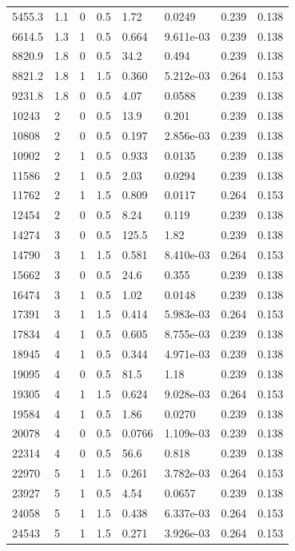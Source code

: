 \documentclass[preview]{standalone}
\begin{document}
{{\begin{tabular}{L{1.2cm}C{1.2cm} C{0.3cm}C{0.5cm} C{1.4cm}C{1.4cm} C{1.4cm}C{1.4cm}}
  5455.3  &   1.1  & 0     & 0.5 &  1.72  & 0.0249  & 0.239 &  0.138   \\ 
  6614.5  &   1.3  & 1     & 0.5 &  0.664  & 9.611e-03  & 0.239 &  0.138   \\ 
  8820.9  &   1.8  & 0     & 0.5 &  34.2  & 0.494  & 0.239 &  0.138   \\ 
  8821.2  &   1.8  & 1     & 1.5 &  0.360  & 5.212e-03  & 0.264 &  0.153   \\ 
  9231.8  &   1.8  & 0     & 0.5 &  4.07  & 0.0588  & 0.239 &  0.138   \\ 
  10243  &     2  & 0     & 0.5 &  13.9  & 0.201  & 0.239 &  0.138   \\ 
  10808  &     2  & 0     & 0.5 &  0.197  & 2.856e-03  & 0.239 &  0.138   \\ 
  10902  &     2  & 1     & 0.5 &  0.933  & 0.0135  & 0.239 &  0.138   \\ 
  11586  &     2  & 1     & 0.5 &  2.03  & 0.0294  & 0.239 &  0.138   \\ 
  11762  &     2  & 1     & 1.5 &  0.809  & 0.0117  & 0.264 &  0.153   \\ 
  12454  &     2  & 0     & 0.5 &  8.24  & 0.119  & 0.239 &  0.138   \\ 
  14274  &     3  & 0     & 0.5 &  125.5  & 1.82  & 0.239 &  0.138   \\ 
  14790  &     3  & 1     & 1.5 &  0.581  & 8.410e-03  & 0.264 &  0.153   \\ 
  15662  &     3  & 0     & 0.5 &  24.6  & 0.355  & 0.239 &  0.138   \\ 
  16474  &     3  & 1     & 0.5 &  1.02  & 0.0148  & 0.239 &  0.138   \\ 
  17391  &     3  & 1     & 1.5 &  0.414  & 5.983e-03  & 0.264 &  0.153   \\ 
  17834  &     4  & 1     & 0.5 &  0.605  & 8.755e-03  & 0.239 &  0.138   \\ 
  18945  &     4  & 1     & 0.5 &  0.344  & 4.971e-03  & 0.239 &  0.138   \\ 
  19095  &     4  & 0     & 0.5 &  81.5  & 1.18  & 0.239 &  0.138   \\ 
  19305  &     4  & 1     & 1.5 &  0.624  & 9.028e-03  & 0.264 &  0.153   \\ 
  19584  &     4  & 1     & 0.5 &  1.86  & 0.0270  & 0.239 &  0.138   \\ 
  20078  &     4  & 0     & 0.5 &  0.0766  & 1.109e-03  & 0.239 &  0.138   \\ 
  22314  &     4  & 0     & 0.5 &  56.6  & 0.818  & 0.239 &  0.138   \\ 
  22970  &     5  & 1     & 1.5 &  0.261  & 3.782e-03  & 0.264 &  0.153   \\ 
  23927  &     5  & 1     & 0.5 &  4.54  & 0.0657  & 0.239 &  0.138   \\ 
  24058  &     5  & 1     & 1.5 &  0.438  & 6.337e-03  & 0.264 &  0.153   \\ 
  24543  &     5  & 1     & 1.5 &  0.271  & 3.926e-03  & 0.264 &  0.153   \\ 
\hline 
\end{tabular} 

}}
\end{document}
